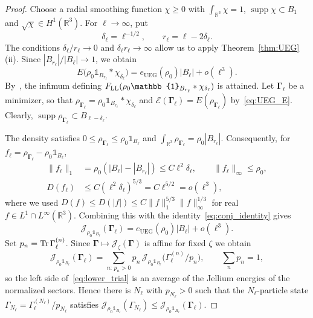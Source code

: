 \documentclass[final,reqno]{amsart}
\DeclareMathOperator{\supp}{supp}
\theoremstyle{remark}
\theoremstyle{definition}
\renewcommand{\le}{\leqslant}
\renewcommand{\ge}{\geqslant}
\newcommand{\RR}{\mathbb{R}}
\newcommand{\iden}{\mathbb{1}}
\newcommand{\EC}{\mathcal{E}}
\newcommand{\UEG}{\mathrm{UEG}}
\newcommand{\vGamma}{{\bm{\Gamma}}}
\begin{document}
\begin{proof}
Choose a radial smoothing function $\chi\ge0$ with $\int_{\RR^3}\chi=1$, $\supp\chi\subset B_1$ and $\sqrt\chi\in H^1(\RR^3)$. For $\ell\to\infty$, put
\[
\delta_\ell=\ell^{-1/2},\qquad r_\ell=\ell-2\delta_\ell.
\]
The conditions $\delta_\ell/r_\ell\to0$ and $\delta_\ell r_\ell\to\infty$ allow us to apply Theorem~\ref{thm:UEG}(ii). Since $|B_{r_\ell}|/|B_\ell|\to1$, we obtain
\[
E\big(\rho_0\iden_{B_{r_\ell}}*\chi_{\delta_\ell}\big)=e_\UEG(\rho_0)|B_\ell|+o(\ell^3).
\]
By~\cite[Thm.~4]{lewin2019universal}, the infimum defining $F_{\rm LL}(\rho_0\iden_{B_{r_\ell}}*\chi_{\delta_\ell})$ is attained. Let $\vGamma_\ell$ be a minimizer, so that $\rho_{\vGamma_\ell}=\rho_0\iden_{B_{r_\ell}}*\chi_{\delta_\ell}$ and $\EC(\vGamma_\ell)=E(\rho_{\vGamma_\ell})$ by~\eqref{eq:UEG_E}. Clearly, $\supp\rho_{\vGamma_\ell}\subset B_{\ell-\delta_\ell}$.

The density satisfies $0\le\rho_{\vGamma_\ell}\le\rho_0\iden_{B_\ell}$ and $\int_{\RR^3}\rho_{\vGamma_\ell}=\rho_0|B_{r_\ell}|$. Consequently, for $f_\ell=\rho_{\vGamma_\ell}-\rho_0\iden_{B_\ell}$,
\begin{align*}
\|f_\ell\|_1&=\rho_0(|B_\ell|-|B_{r_\ell}|)\le C\ell^2\delta_\ell,
\qquad \|f_\ell\|_\infty\le\rho_0,\\
D(f_\ell)&\le C(\ell^2\delta_\ell)^{5/3}=C\ell^{5/2}=o(\ell^3),
\end{align*}
where we used $D(f)\le D(|f|)\le C\|f\|_1^{5/3}\|f\|_\infty^{1/3}$ for real $f\in L^1\cap L^\infty(\RR^3)$. Combining this with the identity~\eqref{eq:conj_identity} gives
\begin{equation}\label{eq:lower_trial}
\mathcal J_{\rho_0\iden_{B_\ell}}(\vGamma_\ell)
=e_\UEG(\rho_0)|B_\ell|+o(\ell^3).
\end{equation}
Set $p_n=\Tr\Gamma_\ell^{(n)}$. Since $\vGamma\mapsto \mathcal J_\zeta(\vGamma)$ is affine for fixed $\zeta$ we obtain
\[
\mathcal J_{\rho_0\iden_{B_\ell}}(\vGamma_\ell)=\sum_{n:\,p_n>0}p_n\,\mathcal J_{\rho_0\iden_{B_\ell}}\big(\Gamma_\ell^{(n)}/p_n\big),\qquad\sum_n p_n=1,
\]
so the left side of~\eqref{eq:lower_trial} is an average of the Jellium energies of the normalized sectors.
Hence there is $N_\ell$ with $p_{N_\ell}>0$ such that the $N_\ell$-particle state $\Gamma_{N_\ell}=\Gamma_\ell^{(N_\ell)}/p_{N_\ell}$ satisfies $\mathcal J_{\rho_0\iden_{B_\ell}}(\Gamma_{N_\ell})\le\mathcal J_{\rho_0\iden_{B_\ell}}(\vGamma_\ell)$.


\end{proof}
\end{document}

